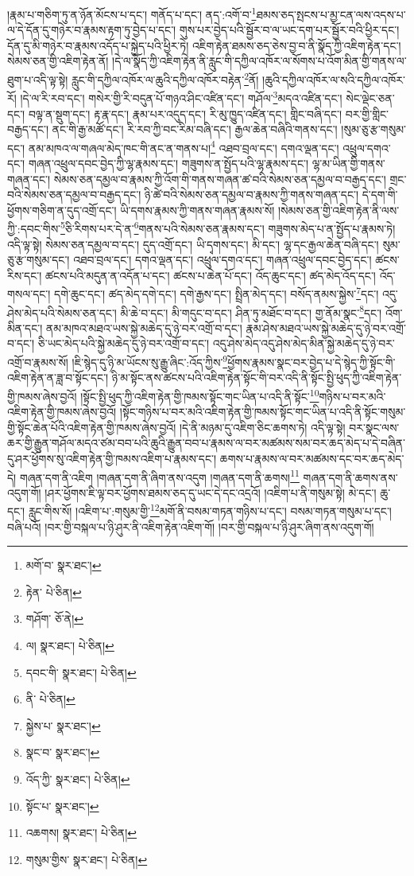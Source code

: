 །རྣམ་པ་གཅིག་ཏུ་ན་ཉོན་མོངས་པ་དང་། གནོད་པ་དང་། ནད་:འགོ་བ་\footnote{མགོ་བ་  སྣར་ཐང་། }ཐམས་ཅད་སྤངས་པ་མྱ་ངན་ལས་འདས་པ་ལ་དེ་དོན་དུ་གཉེར་བ་རྣམས་རྟག་ཏུ་བྱེད་པ་དང་། གུས་པར་བྱེད་པའི་སྦྱོར་བ་ལ་ཡང་དག་པར་སྦྱོར་བའི་ཕྱིར་དང་། དོན་དུ་མི་གཉེར་བ་རྣམས་འདོད་པ་སྐྱེད་པའི་ཕྱིར་ཏེ། འཇིག་རྟེན་ཐམས་ཅད་ཅེས་བྱ་བ་ནི་སྣོད་ཀྱི་འཇིག་རྟེན་དང་། སེམས་ཅན་གྱི་འཇིག་རྟེན་ནོ། །དེ་ལ་སྣོད་ཀྱི་འཇིག་རྟེན་ནི་རླུང་གི་དཀྱིལ་འཁོར་ལ་སོགས་པ་འོག་མིན་གྱི་གནས་ལ་ཐུག་པ་འདི་ལྟ་སྟེ། རླུང་གི་དཀྱིལ་འཁོར་ལ་ཆུའི་དཀྱིལ་འཁོར་བརྟེན་\footnote{རྟེན་  པེ་ཅིན། }ནོ། །ཆུའི་དཀྱིལ་འཁོར་ལ་སའི་དཀྱིལ་འཁོར་རོ། །དེ་ལ་རི་རབ་དང་། གསེར་གྱི་རི་བདུན་པོ་གཉའ་ཤིང་འཛིན་དང་། གཤོལ་\footnote{གཤོག་  ཅོ་ནེ། }མདའ་འཛིན་དང་། སེང་ལྡེང་ཅན་དང་། བལྟ་ན་སྡུག་དང་། རྟ་རྣ་དང་། རྣམ་པར་འདུད་དང་། རི་མུ་ཁྱུད་འཛིན་དང་། གླིང་བཞི་དང་། བར་གྱི་གླིང་བརྒྱད་དང་། ནང་གི་རྒྱ་མཚོ་དང་། རི་རབ་ཀྱི་བང་རིམ་བཞི་དང་། རྒྱལ་ཆེན་བཞིའི་གནས་དང་། །སུམ་ཅུ་རྩ་གསུམ་དང་། ནམ་མཁའ་ལ་གཞལ་མེད་ཁང་གི་ནང་ན་གནས་པ།\footnote{ལ།  སྣར་ཐང་།  པེ་ཅིན། } འཐབ་བྲལ་དང་། དགའ་ལྡན་དང་། འཕྲུལ་དགའ་དང་། གཞན་འཕྲུལ་དབང་བྱེད་ཀྱི་ལྷ་རྣམས་དང་། གཟུགས་ན་སྤྱོད་པའི་ལྷ་རྣམས་དང་། ལྷ་མ་ཡིན་གྱི་གནས་གཞན་དང་། སེམས་ཅན་དམྱལ་བ་རྣམས་ཀྱི་འོག་གི་གནས་གཞན་ཚ་བའི་སེམས་ཅན་དམྱལ་བ་བརྒྱད་དང་། གྲང་བའི་སེམས་ཅན་དམྱལ་བ་བརྒྱད་དང་། ཉི་ཚེ་བའི་སེམས་ཅན་དམྱལ་བ་རྣམས་ཀྱི་གནས་གཞན་དང་། དེ་དག་གི་ཕྱོགས་གཅིག་ན་དུད་འགྲོ་དང་། ཡི་དགས་རྣམས་ཀྱི་གནས་གཞན་རྣམས་སོ། །སེམས་ཅན་གྱི་འཇིག་རྟེན་ནི་ལས་ཀྱི་:དབང་གིས་\footnote{དབང་གི་  སྣར་ཐང་།  པེ་ཅིན། }ཅི་རིགས་པར་དེ་ན་\footnote{ནི་  པེ་ཅིན། }གནས་པའི་སེམས་ཅན་རྣམས་དང་། གཟུགས་མེད་པ་ན་སྤྱོད་པ་རྣམས་ཏེ། འདི་ལྟ་སྟེ། སེམས་ཅན་དམྱལ་བ་དང་། དུད་འགྲོ་དང་། ཡི་དྭགས་དང་། མི་དང་། ལྷ་དང་རྒྱལ་ཆེན་བཞི་དང་། སུམ་ཅུ་རྩ་གསུམ་དང་། འཐབ་བྲལ་དང་། དགའ་ལྡན་དང་། འཕྲུལ་དགའ་དང་། གཞན་འཕྲུལ་དབང་བྱེད་དང་། ཚངས་རིས་དང་། ཚངས་པའི་མདུན་ན་འདོན་པ་དང་། ཚངས་པ་ཆེན་པོ་དང་། འོད་ཆུང་དང་། ཚད་མེད་འོད་དང་། འོད་གསལ་དང་། དགེ་ཆུང་དང་། ཚད་མེད་དགེ་དང་། དགེ་རྒྱས་དང་། སྤྲིན་མེད་དང་། བསོད་ནམས་སྐྱེས་\footnote{སྐྱེས་པ་  སྣར་ཐང་། }དང་། འདུ་ཤེས་མེད་པའི་སེམས་ཅན་དང་། མི་ཆེ་བ་དང་། མི་གདུང་བ་དང་། ཤིན་ཏུ་མཐོང་བ་དང་། གྱ་ནོམ་སྣང་\footnote{སྣང་བ་  སྣར་ཐང་། }དང་། འོག་མིན་དང་། ནམ་མཁའ་མཐའ་ཡས་སྐྱེ་མཆེད་དུ་ཉེ་བར་འགྲོ་བ་དང་། རྣམ་ཤེས་མཐའ་ཡས་སྐྱེ་མཆེད་དུ་ཉེ་བར་འགྲོ་བ་དང་། ཅི་ཡང་མེད་པའི་སྐྱེ་མཆེད་དུ་ཉེ་བར་འགྲོ་བ་དང་། འདུ་ཤེས་མེད་འདུ་ཤེས་མེད་མིན་སྐྱེ་མཆེད་དུ་ཉེ་བར་འགྲོ་བ་རྣམས་སོ། །ཇི་སྙེད་དུ་ཉི་མ་ཡོངས་སུ་རྒྱུ་ཞིང་:འོད་ཀྱིས་\footnote{འོད་ཀྱི་  སྣར་ཐང་།  པེ་ཅིན། }ཕྱོགས་རྣམས་སྣང་བར་བྱེད་པ་དེ་སྙེད་ཀྱི་སྟོང་གི་འཇིག་རྟེན་ན་ཟླ་བ་སྟོང་དང་། ཉི་མ་སྟོང་ནས་ཚངས་པའི་འཇིག་རྟེན་སྟོང་གི་བར་འདི་ནི་སྟོང་སྤྱི་ཕུད་ཀྱི་འཇིག་རྟེན་གྱི་ཁམས་ཞེས་བྱའོ། །སྟོང་སྤྱི་ཕུད་ཀྱི་འཇིག་རྟེན་གྱི་ཁམས་སྟོང་གང་ཡིན་པ་འདི་ནི་སྟོང་\footnote{སྟོང་པ་  སྣར་ཐང་། }གཉིས་པ་བར་མའི་འཇིག་རྟེན་གྱི་ཁམས་ཞེས་བྱའོ། །སྟོང་གཉིས་པ་བར་མའི་འཇིག་རྟེན་གྱི་ཁམས་སྟོང་གང་ཡིན་པ་འདི་ནི་སྟོང་གསུམ་གྱི་སྟོང་ཆེན་པོའི་འཇིག་རྟེན་གྱི་ཁམས་ཞེས་བྱའོ། །དེ་ནི་མཉམ་དུ་འཇིག་ཅིང་ཆགས་ཏེ། འདི་ལྟ་སྟེ། བར་སྣང་ལས་ཆར་གྱི་རྒྱུན་གཤོལ་མདའ་ཙམ་བབ་པའི་ཆུའི་རྒྱུན་བབ་པ་རྣམས་ལ་བར་མཚམས་སམ་བར་ཆད་མེད་པ་དེ་བཞིན་དུ་ཤར་ཕྱོགས་སུ་འཇིག་རྟེན་གྱི་ཁམས་འཇིག་པ་རྣམས་དང་། ཆགས་པ་རྣམས་ལ་བར་མཚམས་དང་བར་ཆད་མེད་དེ། གཞན་དག་ནི་འཇིག །གཞན་དག་ནི་ཞིག་ནས་འདུག །གཞན་དག་ནི་ཆགས།\footnote{འཆགས།  སྣར་ཐང་།  པེ་ཅིན། } གཞན་དག་ནི་ཆགས་ནས་འདུག་གོ། །ཤར་ཕྱོགས་ཇི་ལྟ་བར་ཕྱོགས་ཐམས་ཅད་དུ་ཡང་དེ་དང་འདྲའོ། །འཇིག་པ་ནི་གསུམ་སྟེ། མེ་དང་། ཆུ་དང་། རླུང་གིས་སོ། །འཇིག་པ་:གསུམ་གྱི་\footnote{གསུམ་གྱིས་  སྣར་ཐང་།  པེ་ཅིན། }མགོ་ནི་བསམ་གཏན་གཉིས་པ་དང་། བསམ་གཏན་གསུམ་པ་དང་། བཞི་པའོ། །བར་གྱི་བསྐལ་པ་ཉི་ཤུར་ནི་འཇིག་རྟེན་འཇིག་གོ། །བར་གྱི་བསྐལ་པ་ཉི་ཤུར་ཞིག་ནས་འདུག་གོ། 